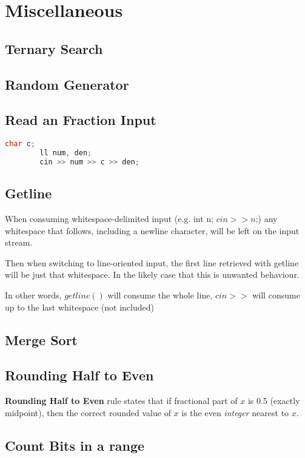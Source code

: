\chapter{Miscellaneous}

\section{Ternary Search}


\section{Random Generator}


\section{Read an Fraction Input}

    \begin{lstlisting}[language=c++]
        char c;
        ll num, den;
        cin >> num >> c >> den;
    \end{lstlisting}

\section{Getline}

    When consuming whitespace-delimited input (e.g. int n; $cin >> n$;) any whitespace that follows, 
    including a newline character, will be left on the input stream. 

    Then when switching to line-oriented input, the first line retrieved with getline will be just that whitespace. In the likely case that this is unwanted behaviour.

    In other words, $getline()$ will consume the whole line, $cin>>$ will consume up to the last whitespace (not included) 


\section{Merge Sort}


\section{Rounding Half to Even}

    \textbf{Rounding Half to Even} rule states that 
    if fractional part of $x$ is 0.5 (exactly midpoint), then the correct rounded value of $x$ is the even \textit{integer} nearest to $x$.


\section{Count Bits in a range}

